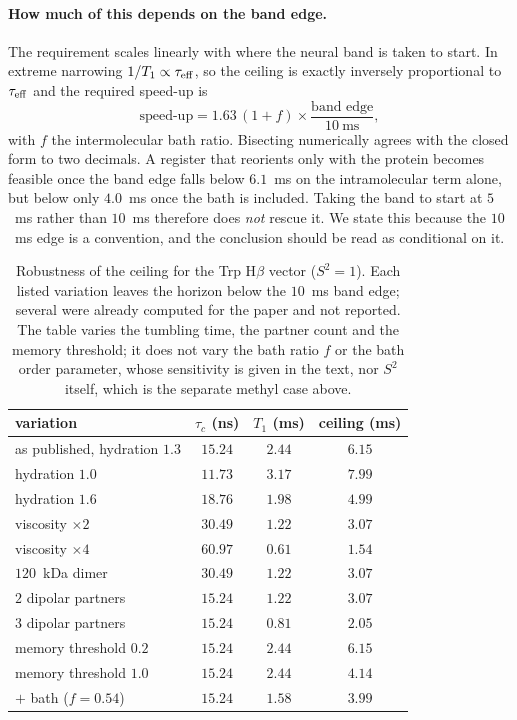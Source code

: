 \documentclass[aps,prx,reprint,superscriptaddress,nofootinbib,floatfix]{revtex4-2}
\begin{document}
\paragraph*{How much of this depends on the band edge.} The requirement scales
linearly with where the neural band is taken to start. In extreme narrowing
$1/T_1\propto\tau_{\rm eff}$, so the ceiling is exactly inversely proportional to
$\tau_{\rm eff}$ and the required speed-up is
\begin{equation*}
\text{speed-up} = 1.63\,(1+f)\times\frac{\text{band edge}}{10~\mathrm{ms}},
\end{equation*}
with $f$ the intermolecular bath ratio. Bisecting numerically agrees with the
closed form to two decimals. A register that reorients only with the protein
becomes feasible once the band edge falls below $6.1$~ms on the intramolecular
term alone, but below only $4.0$~ms once the bath is included. Taking the band to
start at $5$~ms rather than $10$~ms therefore does \emph{not} rescue it. We state
this because the $10$~ms edge is a convention, and the conclusion should be read
as conditional on it.

\begin{table}[H]
\caption{\label{tab:robust}Robustness of the ceiling for the Trp H$\beta$ vector
($S^2=1$). Each listed variation leaves the horizon below the $10$~ms band edge;
several were already computed for the paper and not reported. The table varies
the tumbling time, the partner count and the memory threshold; it does not vary
the bath ratio $f$ or the bath order parameter, whose sensitivity is given in the
text, nor $S^2$ itself, which is the separate methyl case above.}
\begin{ruledtabular}
\begin{tabular}{lccc}
variation & $\tau_c$ (ns) & $T_1$ (ms) & ceiling (ms) \\
\hline
as published, hydration $1.3$ & $15.24$ & $2.44$ & $6.15$ \\
hydration $1.0$ & $11.73$ & $3.17$ & $7.99$ \\
hydration $1.6$ & $18.76$ & $1.98$ & $4.99$ \\
viscosity $\times2$ & $30.49$ & $1.22$ & $3.07$ \\
viscosity $\times4$ & $60.97$ & $0.61$ & $1.54$ \\
$120$~kDa dimer & $30.49$ & $1.22$ & $3.07$ \\
$2$ dipolar partners & $15.24$ & $1.22$ & $3.07$ \\
$3$ dipolar partners & $15.24$ & $0.81$ & $2.05$ \\
memory threshold $0.2$ & $15.24$ & $2.44$ & $6.15$ \\
memory threshold $1.0$ & $15.24$ & $2.44$ & $4.14$ \\
$+$ bath ($f=0.54$) & $15.24$ & $1.58$ & $3.99$ \\
\end{tabular}
\end{ruledtabular}
\end{table}
\end{document}
